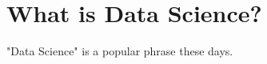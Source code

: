 \newcommand\chapternumber{1}

\usepackage{enumerate}
\usepackage{float}



\section*{What is Data Science?}

"Data Science" is a popular phrase these days.

